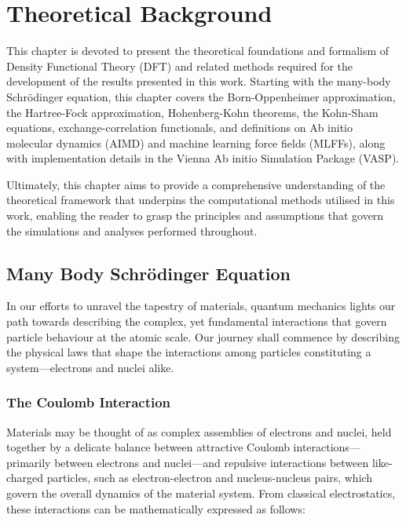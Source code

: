 
\chapter{Theoretical Background} %

\label{Chapter2} %

This chapter is devoted to present the theoretical foundations and formalism of Density Functional Theory (DFT) and related methods required for the development of the results presented in this work. Starting with the many-body Schrödinger equation, this chapter covers the Born-Oppenheimer approximation, the Hartree-Fock approximation, Hohenberg-Kohn theorems, the Kohn-Sham equations, exchange-correlation functionals, and definitions on Ab initio molecular dynamics (AIMD) and machine learning force fields (MLFFs), along with implementation details in the Vienna Ab initio Simulation Package (VASP).

Ultimately, this chapter aims to provide a comprehensive understanding of the theoretical framework that underpins the computational methods utilised in this work, enabling the reader to grasp the principles and assumptions that govern the simulations and analyses performed throughout.

\section{Many Body Schrödinger Equation}
In our efforts to unravel the tapestry of materials, quantum mechanics lights our path towards describing the complex, yet fundamental interactions that govern particle behaviour at the atomic scale. Our journey shall commence by describing the physical laws that shape the interactions among particles constituting a system---electrons and nuclei alike. 

\subsection{The Coulomb Interaction}

Materials may be thought of as complex assemblies of electrons and nuclei, held together by a delicate balance between attractive Coulomb interactions---primarily between electrons and nuclei---and repulsive interactions between like-charged particles, such as electron-electron and nucleus-nucleus pairs, which govern the overall dynamics of the material system\supercite{giustino2014materials, sholl2023density, kaxiras2003atomic}.  From classical electrostatics, these interactions can be mathematically expressed as follows: 

